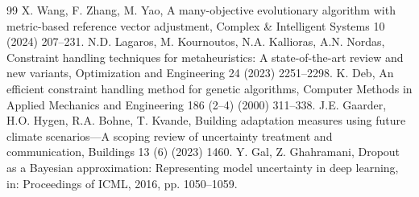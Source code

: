 \documentclass[11pt]{article}
\begin{document}
\begin{thebibliography}{99}
 X. Wang, F. Zhang, M. Yao, A many-objective evolutionary algorithm with metric-based reference vector adjustment, Complex \& Intelligent Systems 10 (2024) 207--231.
 N.D. Lagaros, M. Kournoutos, N.A. Kallioras, A.N. Nordas, Constraint handling techniques for metaheuristics: A state-of-the-art review and new variants, Optimization and Engineering 24 (2023) 2251--2298.
 K. Deb, An efficient constraint handling method for genetic algorithms, Computer Methods in Applied Mechanics and Engineering 186 (2--4) (2000) 311--338.
 J.E. Gaarder, H.O. Hygen, R.A. Bohne, T. Kvande, Building adaptation measures using future climate scenarios---A scoping review of uncertainty treatment and communication, Buildings 13 (6) (2023) 1460.
 Y. Gal, Z. Ghahramani, Dropout as a Bayesian approximation: Representing model uncertainty in deep learning, in: Proceedings of ICML, 2016, pp. 1050--1059.
\end{thebibliography}
\end{document}
